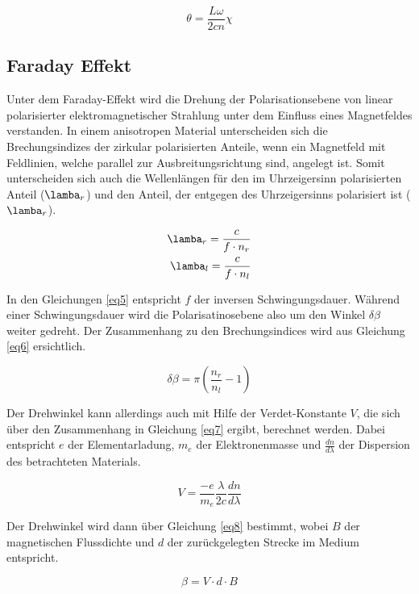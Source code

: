 \begin{equation}
    \theta = \frac{L\omega}{2cn} \chi
    \label{eq4}
\end{equation}

\subsection{Faraday Effekt}
Unter dem Faraday-Effekt wird die Drehung der Polarisationsebene von linear 
polarisierter
elektromagnetischer Strahlung unter dem Einfluss eines Magnetfeldes verstanden.
In einem anisotropen Material unterscheiden sich die Brechungsindizes der 
zirkular polarisierten Anteile, wenn ein Magnetfeld mit Feldlinien, welche 
parallel zur Ausbreitungsrichtung sind, angelegt ist. Somit 
unterscheiden sich auch die Wellenlängen für den im Uhrzeigersinn polarisierten 
Anteil ($\lamba_{r}$) und den Anteil, der entgegen des Uhrzeigersinns polarisiert 
ist ($\lamba_{r}$).

\begin{align}
    \lamba_{r} = \frac{c}{f\cdot n_{r}}\\
    \lamba_{l} = \frac{c}{f\cdot n_{l}}
    \label{eq5}
\end{align}

In den Gleichungen \ref{eq5} entspricht $f$ der inversen Schwingungsdauer.
Während einer Schwingungsdauer wird die Polarisatinosebene also um den Winkel 
$\delta \beta$ weiter gedreht. Der Zusammenhang zu den Brechungsindices wird aus 
Gleichung \ref{eq6} ersichtlich.

\begin{equation}
    \delta \beta = \pi \left( \frac{n_r}{n_l} -1 \right)
    \label{eq6}
\end{equation}

Der Drehwinkel kann allerdings auch mit Hilfe der Verdet-Konstante $V$, die sich 
über den Zusammenhang in Gleichung \ref{eq7} ergibt, berechnet werden.
Dabei entspricht $e$ der Elementarladung, $m_e$ der Elektronenmasse und 
$\frac{dn}{d\lambda}$ der 
Dispersion des betrachteten Materials.

\begin{equation}
    V = \frac{-e}{m_e} \frac{\lambda}{2c} \frac{dn}{d\lambda}
    \label{eq7}
\end{equation}

Der Drehwinkel wird dann über Gleichung \ref{eq8} bestimmt, wobei 
$B$ der magnetischen Flussdichte und $d$ der zurückgelegten Strecke 
im Medium entspricht.

\begin{equation}
    \beta = V \cdot d \cdot B
    \label{eq8}
\end{equation}

\cite{sample}

